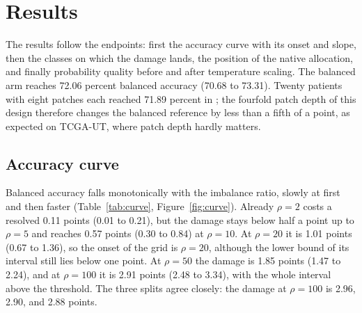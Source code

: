 \section{Results}
\label{sec:results}
The results follow the endpoints: first the accuracy curve with its onset and slope, then the classes on which the damage lands, the position of the native allocation, and finally probability quality before and after temperature scaling. The balanced arm reaches 72.06 percent balanced accuracy (70.68 to 73.31). Twenty patients with eight patches each reached 71.89 percent in \citet{queisler2026centreError}; the fourfold patch depth of this design therefore changes the balanced reference by less than a fifth of a point, as expected on TCGA-UT, where patch depth hardly matters.

\subsection{Accuracy curve}
\label{sec:curve-results}
Balanced accuracy falls monotonically with the imbalance ratio, slowly at first and then faster (Table~\ref{tab:curve}, Figure~\ref{fig:curve}). Already $\rho=2$ costs a resolved 0.11 points (0.01 to 0.21), but the damage stays below half a point up to $\rho=5$ and reaches 0.57 points (0.30 to 0.84) at $\rho=10$. At $\rho=20$ it is 1.01 points (0.67 to 1.36), so the onset of the grid is $\rho=20$, although the lower bound of its interval still lies below one point. At $\rho=50$ the damage is 1.85 points (1.47 to 2.24), and at $\rho=100$ it is 2.91 points (2.48 to 3.34), with the whole interval above the threshold. The three splits agree closely: the damage at $\rho=100$ is 2.96, 2.90, and 2.88 points.

